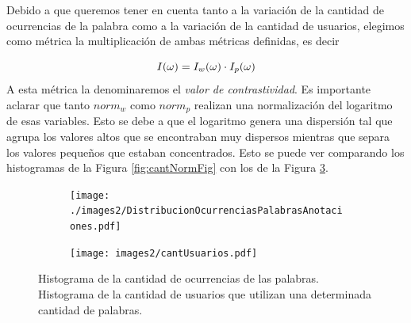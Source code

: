 
Debido a que queremos tener en cuenta tanto a la variación de la cantidad de ocurrencias de la palabra como a la variación de la cantidad de usuarios, elegimos como métrica la multiplicación de ambas métricas definidas, es decir  

\begin{equation}
I(\omega) =  I_w (\omega) \cdot I_p(\omega)\\
\label{eq:ivalor}
\end{equation}
A esta métrica la denominaremos el \textit{valor de contrastividad}.
Es importante aclarar que tanto $norm_{w}$ como $norm_p$ realizan una normalización del logaritmo de esas variables. Esto se debe a que el logaritmo genera una dispersión tal que agrupa los valores altos que se encontraban muy dispersos mientras que separa los valores pequeños que estaban concentrados. Esto se puede ver comparando los histogramas de la Figura \ref{fig:cantNormFig} con los de la Figura \ref{fig:cantPalabrasSinNorm}.




\begin{figure}[!ht]\centering
  \begin{subfigure}[t]{0.49\textwidth}
    \texttt{[image: ./images2/DistribucionOcurrenciasPalabrasAnotaciones.pdf]}
    \caption{}
    \label{fig:cantPalabrasAnotaciones} 
   \end{subfigure}
   \begin{subfigure}[t]{0.49\textwidth}
    \texttt{[image: images2/cantUsuarios.pdf]} 
    \caption{}
    \label{fig:cantUsuarios} 
   \end{subfigure}
   \caption{ Histograma de la cantidad de ocurrencias de las palabras.  Histograma de la cantidad de usuarios que utilizan una determinada cantidad de palabras.} 
   \label{fig:cantPalabrasSinNorm} 
\end{figure}

